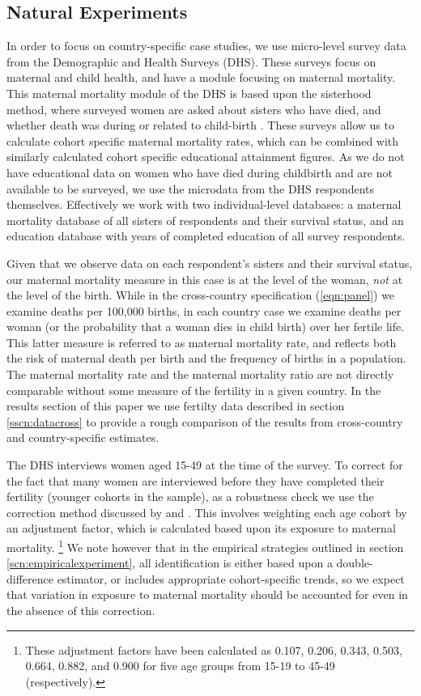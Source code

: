 \documentclass{article}[12pt,subeqn]
\begin{document}
\begin{spacing}{1.4}
\subsection{Natural Experiments}
\label{sscn:dataexp}
In order to focus on country-specific case studies, we use micro-level survey 
data from the Demographic and Health Surveys (DHS). These surveys focus on 
maternal and child health, and have a module focusing on maternal mortality. This 
maternal mortality module of the DHS is based upon the sisterhood method, where 
surveyed women are asked about sisters who have died, and whether death was during 
or related to child-birth \citep{RutsteinRojas2006}. These surveys allow us to 
calculate cohort specific maternal mortality rates, which can be combined with 
similarly calculated cohort specific educational attainment figures. As 
we do not have educational data on women who have died during childbirth and are 
not available to be surveyed, we use the microdata from the DHS respondents 
themselves.  Effectively we work with two individual-level databases: a maternal 
mortality database of all sisters of respondents and their survival status, and 
an education database with years of completed education of all survey respondents.

Given that we observe data on each respondent's sisters and their survival 
status, our maternal mortality measure in this case is at the level of the woman, 
\emph{not} at the level of the birth.  While in the cross-country specification 
(\ref{eqn:panel}) we examine deaths per 100,000 births, in each country case we 
examine deaths per woman (or the probability that a woman dies in child birth) 
over her fertile life. This latter measure is referred to as maternal mortality 
rate, and reflects both the risk of maternal death per birth and the frequency of 
births in a population.  The maternal mortality rate and the maternal mortality 
ratio are not directly comparable without some measure of the fertility in a given 
country. In the results section of this paper we use fertilty data described in 
section \ref{sscn:datacross} to provide a rough comparison of the results from 
cross-country and country-specific estimates.

The DHS interviews women aged 15-49 at the time of the survey. To correct 
for the fact that many women are interviewed before they have completed their 
fertility (younger cohorts in the sample), as a robustness check we use the 
correction method discussed by \citet{RutsteinRojas2006} and 
\citet{Stantonetal1997}. This involves weighting each age cohort by an adjustment 
factor, which is calculated based upon its exposure to maternal mortality.%
\footnote{These adjustment factors have been calculated as 0.107, 0.206, 0.343, 
0.503, 0.664, 0.882, and 0.900 for five age groups from 15-19 to 45-49 
(respectively).}  We note however that in the empirical strategies outlined in 
section \ref{scn:empiricalexperiment}, all identification is either based upon a 
double-difference estimator, or includes appropriate cohort-specific trends, so 
we expect that variation in exposure to maternal mortality should be accounted for 
even in the absence of this correction.


\end{spacing}
\end{document}
